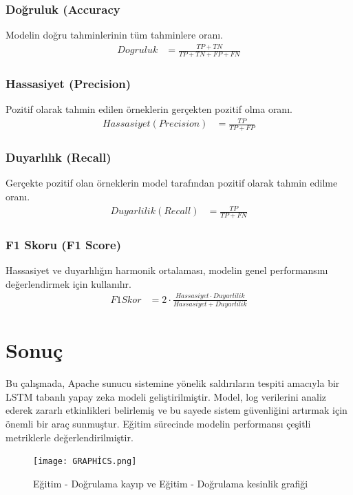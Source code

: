 \documentclass[12pt,a4paper]{article}
\begin{document}
\subsubsection{Doğruluk (Accuracy}
\quad Modelin doğru tahminlerinin tüm tahminlere oranı.
\begin{align}
Dogruluk &= \frac{TP+TN}{TP+TN+FP+FN}
\end{align}

\subsubsection{Hassasiyet (Precision)}
\quad Pozitif olarak tahmin edilen örneklerin gerçekten pozitif olma oranı.
\begin{align}
Hassasiyet (Precision) &= \frac{TP}{TP+FP}
\end{align}

\subsubsection{Duyarlılık (Recall)}
\quad Gerçekte pozitif olan örneklerin model tarafından pozitif olarak tahmin edilme oranı.
\begin{align}
Duyarlilik (Recall) &= \frac{TP}{TP+FN}
\end{align}


\subsubsection{F1 Skoru (F1 Score)}
\quad Hassasiyet ve duyarlılığın harmonik ortalaması, modelin genel performansını değerlendirmek için kullanılır.
\begin{align}
F1 Skor &= 2 \cdot \frac{Hassasiyet \cdot Duyarlilik}{Hassasiyet + Duyarlilik}
\end{align}

\section{Sonuç}
Bu çalışmada, Apache sunucu sistemine yönelik saldırıların tespiti amacıyla bir LSTM tabanlı yapay zeka modeli geliştirilmiştir. Model, log verilerini analiz ederek zararlı etkinlikleri belirlemiş ve bu sayede sistem güvenliğini artırmak için önemli bir araç sunmuştur. Eğitim sürecinde modelin performansı çeşitli metriklerle değerlendirilmiştir. 

\begin{figure}[!htbp]
    \centering
    \texttt{[image: GRAPHİCS.png]}
    \caption{Eğitim - Doğrulama kayıp ve Eğitim - Doğrulama kesinlik grafiği}
    \label{fig:enter-label}
\end{figure}
\end{document}

